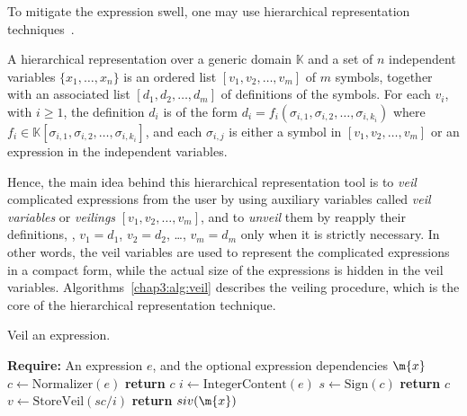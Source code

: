 To mitigate the expression swell, one may use hierarchical representation techniques~\cite{carette2006linear, zhou2006hierarchical}.
%
\begin{definition}
  A hierarchical representation over a generic domain $\mathbb{K}$ and a set of $n$ independent variables $\{x_1, \dots, x_n\}$ is an ordered list $[v_1, v_2, \dots, v_m]$ of $m$ symbols, together with an associated list $[d_1, d_2, \dots, d_m]$ of definitions of the symbols. For each $v_i$, with $i \geq 1$, the definition $d_i$ is of the form $d_i = f_i(\sigma_{i,1}, \sigma_{i,2}, \dots, \sigma_{i,k_i})$ where $f_i \in \mathbb{K}[\sigma_{i,1}, \sigma_{i,2}, \dots, \sigma_{i,k_i}]$, and each $\sigma_{i,j}$ is either a symbol in $[v_1, v_2, \dots, v_m]$ or an expression in the independent variables.
\end{definition}
%
Hence, the main idea behind this hierarchical representation tool is to \emph{veil} complicated expressions from the user by using auxiliary variables called \emph{veil variables} or \emph{veilings} $[v_1, v_2, \dots, v_m]$, and to \emph{unveil} them by reapply their definitions, \ie{}, $v_1 = d_1$, $v_2 = d_2$, \dots, $v_m = d_m$ only when it is strictly necessary. In other words, the veil variables are used to represent the complicated expressions in a compact form, while the actual size of the expressions is hidden in the veil variables. Algorithms~\ref{chap3:alg:veil} describes the veiling procedure, which is the core of the hierarchical representation technique.

\begin{breakablealgorithm}
  \caption{Veil an expression.}
  \label{chap3:alg:veil}
  \begin{algorithmic}[1]
    \State \textbf{Require:} An expression $e$, and the optional expression dependencies $\m{x}$
     
    \State $c \gets \mathrm{Normalizer}(e)$ 
     
      \State \textbf{return} $c$ 
    \EndIf
    \State $i \gets \mathrm{IntegerContent}(e)$ 
    \State $s \gets \mathrm{Sign}(c)$ 
     
      \State \textbf{return} $c$ 
    \Else
      \State $v \gets \mathrm{StoreVeil}(sc/i)$ 
      \State \textbf{return} $siv(\m{x})$ 
    \EndIf
    \EndProcedure
  \end{algorithmic}
\end{breakablealgorithm}

